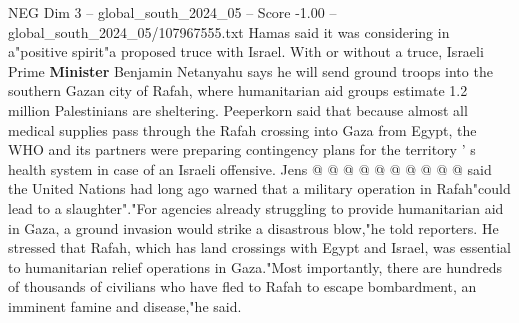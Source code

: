 \begin{textsample}{NEG Dim 3 – global\_south\_2024\_05 – Score -1.00 – global\_south\_2024\_05/107967555.txt}
Hamas said it was considering in a"positive spirit"a proposed truce with Israel.
With or without a truce, Israeli Prime \textbf{Minister} Benjamin Netanyahu says he will send ground troops into the southern Gazan city of Rafah, where humanitarian aid groups estimate 1.2 million Palestinians are sheltering.
Peeperkorn said that because almost all medical supplies pass through the Rafah crossing into Gaza from Egypt, the WHO and its partners were preparing contingency plans for the territory ' s health system in case of an Israeli offensive.
Jens @ @ @ @ @ @ @ @ @ @ said the United Nations had long ago warned that a military operation in Rafah"could lead to a slaughter"."For agencies already struggling to provide humanitarian aid in Gaza, a ground invasion would strike a disastrous blow,"he told reporters.
He stressed that Rafah, which has land crossings with Egypt and Israel, was essential to humanitarian relief operations in Gaza."Most importantly, there are hundreds of thousands of civilians who have fled to Rafah to escape bombardment, an imminent famine and disease,"he said.

\end{textsample}
